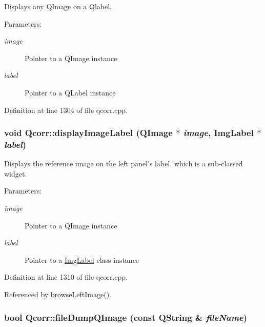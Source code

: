 Displays any QImage on a Qlabel. 

\begin{Desc}
\item[Parameters:]
\begin{description}
\item[{\em image}]Pointer to a QImage instance \item[{\em label}]Pointer to a QLabel instance \end{description}
\end{Desc}


Definition at line 1304 of file qcorr.cpp.\hypertarget{classQcorr_fddb022a6024a32be3b47016308d6c50}{
\subsubsection[{displayImageLabel}]{\setlength{\rightskip}{0pt plus 5cm}void Qcorr::displayImageLabel (QImage $\ast$ {\em image}, \/  ImgLabel $\ast$ {\em label})}}
\label{classQcorr_fddb022a6024a32be3b47016308d6c50}


Displays the reference image on the left panel's label. which is a sub-classed widget. 

\begin{Desc}
\item[Parameters:]
\begin{description}
\item[{\em image}]Pointer to a QImage instance \item[{\em label}]Pointer to a \hyperlink{classImgLabel}{ImgLabel} class instance \end{description}
\end{Desc}


Definition at line 1310 of file qcorr.cpp.

Referenced by browseLeftImage().\hypertarget{classQcorr_87229fc918fa4011e96fbadb325fd52e}{
\subsubsection[{fileDumpQImage}]{\setlength{\rightskip}{0pt plus 5cm}bool Qcorr::fileDumpQImage (const QString \& {\em fileName})}}
\label{classQcorr_87229fc918fa4011e96fbadb325fd52e}


